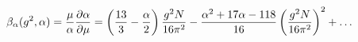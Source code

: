 \begin{equation}
\beta _{\alpha }(g^{2},\alpha)=\frac{\mu}{\alpha}\frac{\partial\alpha}{%
\partial\mu}= \left( \frac{13}{3}-\frac{\alpha }{2}\right) \frac{g^{2}N}{%
16\pi ^{2}}-\frac{\alpha^{2}+17\alpha-118}{16}\left(\frac{g^{2}N}{16\pi ^{2}}%
\right)^2+\ldots  \label{ba}
\end{equation}

